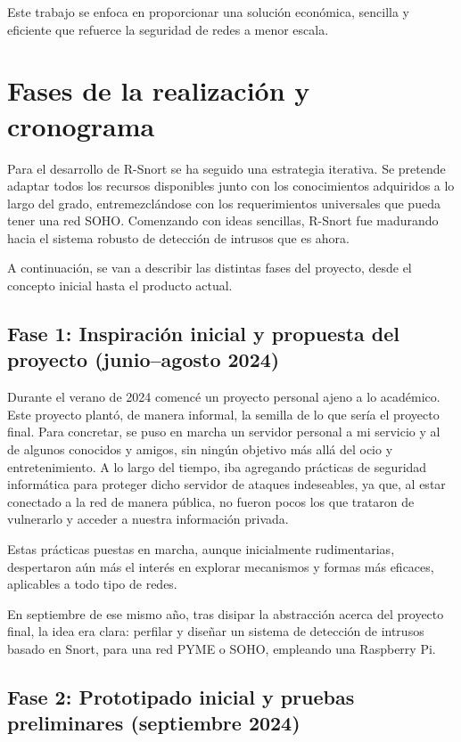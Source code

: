 \documentclass[11pt,a4paper,twoside]{report}
\begin{document}
Este trabajo se enfoca en proporcionar una solución económica, sencilla y eficiente que refuerce la seguridad de redes a menor escala.

\chapter{Fases de la realización y cronograma}

Para el desarrollo de R-Snort se ha seguido una estrategia iterativa. Se pretende adaptar todos los recursos disponibles junto con los conocimientos adquiridos a lo largo del grado, entremezclándose con los requerimientos universales que pueda tener una red SOHO. Comenzando con ideas sencillas, R-Snort fue madurando hacia el sistema robusto de detección de intrusos que es ahora.\newline

A continuación, se van a describir las distintas fases del proyecto, desde el concepto inicial hasta el producto actual.

\section{Fase 1: Inspiración inicial y propuesta del proyecto (junio–agosto 2024)}

Durante el verano de 2024 comencé un proyecto personal ajeno a lo académico. Este proyecto plantó, de manera informal, la semilla de lo que sería el proyecto final. Para concretar, se puso en marcha un servidor personal a mi servicio y al de algunos conocidos y amigos, sin ningún objetivo más allá del ocio y entretenimiento. A lo largo del tiempo, iba agregando prácticas de seguridad informática para proteger dicho servidor de ataques indeseables, ya que, al estar conectado a la red de manera pública, no fueron pocos los que trataron de vulnerarlo y acceder a nuestra información privada.\newline

Estas prácticas puestas en marcha, aunque inicialmente rudimentarias, despertaron aún más el interés en explorar mecanismos y formas más eficaces, aplicables a todo tipo de redes.\newline

En septiembre de ese mismo año, tras disipar la abstracción acerca del proyecto final, la idea era clara: perfilar y diseñar un sistema de detección de intrusos basado en Snort, para una red PYME o SOHO, empleando una Raspberry Pi.

\section{Fase 2: Prototipado inicial y pruebas preliminares (septiembre 2024)}
\end{document}
